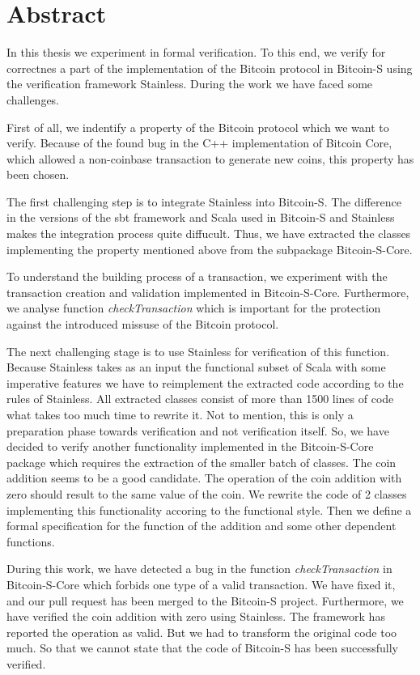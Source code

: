 \chapter*{Abstract}
\label{chap:abstract}


In this thesis we experiment in formal verification.
To this end, we verify for correctnes a part of the implementation of the Bitcoin protocol in Bitcoin-S using the verification framework Stainless.
During the work we have faced some challenges.

First of all, we indentify a property of the Bitcoin protocol which we want to verify.
Because of the found bug in the C++ implementation of Bitcoin Core, which allowed a non-coinbase transaction to generate new coins, this property has been chosen.

The first challenging step is to integrate Stainless into Bitcoin-S.
The difference in the versions of the sbt framework and Scala used in Bitcoin-S and Stainless makes the integration process quite diffucult.
Thus, we have extracted the classes implementing the property mentioned above from the subpackage Bitcoin-S-Core.

To understand the building process of a transaction, we experiment with the transaction creation and validation implemented in Bitcoin-S-Core.
Furthermore, we analyse function \textit{checkTransaction} which is important for the protection against the introduced missuse of the Bitcoin protocol.

The next challenging stage is to use Stainless for verification of this function.
Because Stainless takes as an input the functional subset of Scala with some imperative features we have to reimplement the extracted code according to the rules of Stainless.
All extracted classes consist of more than 1500 lines of code what takes too much time to rewrite it. 
Not to mention, this is only a preparation phase towards verification and not verification itself.
So, we have decided to verify another functionality implemented in the Bitcoin-S-Core package which requires the extraction of the smaller batch of classes.
The coin addition seems to be a good candidate.
The operation of the coin addition with zero should result to the same value of the coin.
We rewrite the code of 2 classes implementing this functionality accoring to the functional style.
Then we define a formal specification for the function of the addition and some other dependent functions.

During this work, we have detected a bug in the function \textit{checkTransaction} in Bitcoin-S-Core which forbids one type of a valid transaction.
We have fixed it, and our pull request has been merged to the Bitcoin-S project.
Furthermore, we have verified the coin addition with zero using Stainless.
The framework has reported the operation as valid.
But we had to transform the original code too much. So that we cannot state that the code of Bitcoin-S has been successfully verified.

